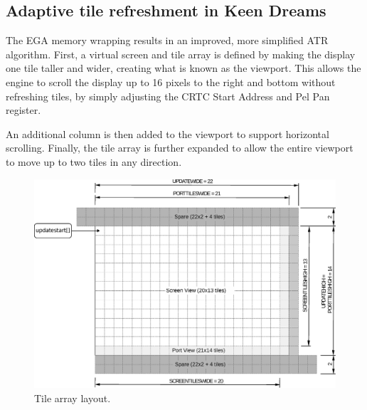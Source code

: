 \documentclass[book.tex]{subfiles}
\begin{document}
 
\par
\begin{minipage}{\textwidth}
  
  \end{minipage}
  \label{ega_latch_copy}


\subsection{Adaptive tile refreshment in Keen Dreams} 
\label{section:scroll_refresh_dreams}
The EGA memory wrapping results in an improved, more simplified ATR algorithm. First, a virtual screen and tile array is defined by making the display one tile taller and wider, creating what is known as the viewport. This allows the engine to scroll the display up to 16 pixels to the right and bottom without refreshing tiles, by simply adjusting the CRTC Start Address and Pel Pan register. \\

\par
An additional column is then added to the viewport to support horizontal scrolling. Finally, the tile array is further expanded to allow the entire viewport to move up to two tiles in any direction.\\

\begin{figure}[H]
\centering
\includegraphics[width=\textwidth]{imgs/drawings/buffer_tile_layout.eps}
\caption{Tile array layout.}
\label{fig:screen_setup}
\end{figure}
\end{document}
